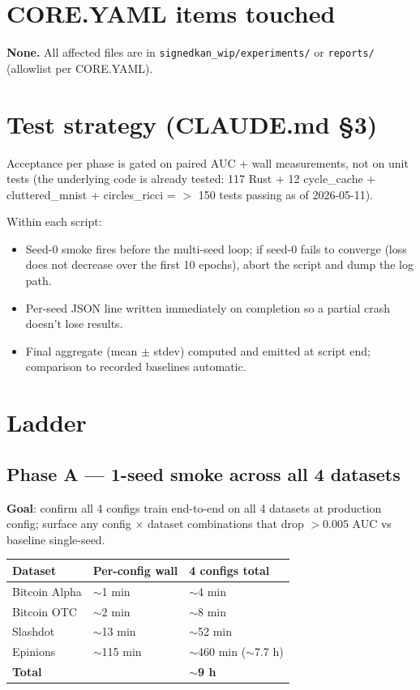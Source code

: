 \documentclass[11pt,a4paper]{article}
\begin{document}
\section{CORE.YAML items touched}
\textbf{None.}  All affected files are in
\texttt{signedkan\_wip/experiments/} or \texttt{reports/} (allowlist
per CORE.YAML).

\section{Test strategy (CLAUDE.md \S3)}
Acceptance per phase is gated on paired AUC + wall measurements,
not on unit tests (the underlying code is already tested:
117 Rust + 12 cycle\_cache + cluttered\_mnist + circles\_ricci =
$>$ 150 tests passing as of 2026-05-11).

Within each script:
\begin{itemize}
\item Seed-0 smoke fires before the multi-seed loop; if seed-0
  fails to converge (loss does not decrease over the first 10
  epochs), abort the script and dump the log path.
\item Per-seed JSON line written immediately on completion so a
  partial crash doesn't lose results.
\item Final aggregate (mean $\pm$ stdev) computed and emitted at
  script end; comparison to recorded baselines automatic.
\end{itemize}

\section{Ladder}

\subsection*{Phase A --- 1-seed smoke across all 4 datasets}
\textbf{Goal}: confirm all 4 configs train end-to-end on all 4
datasets at production config; surface any config $\times$ dataset
combinations that drop $> 0.005$ AUC vs baseline single-seed.

\begin{tabular}{lll}
\toprule
Dataset & Per-config wall & 4 configs total \\
\midrule
Bitcoin Alpha & $\sim$1 min & $\sim$4 min \\
Bitcoin OTC   & $\sim$2 min & $\sim$8 min \\
Slashdot      & $\sim$13 min & $\sim$52 min \\
Epinions      & $\sim$115 min & $\sim$460 min ($\sim$7.7 h) \\
\midrule
\textbf{Total} & & $\sim$\textbf{9 h} \\
\bottomrule
\end{tabular}
\end{document}
